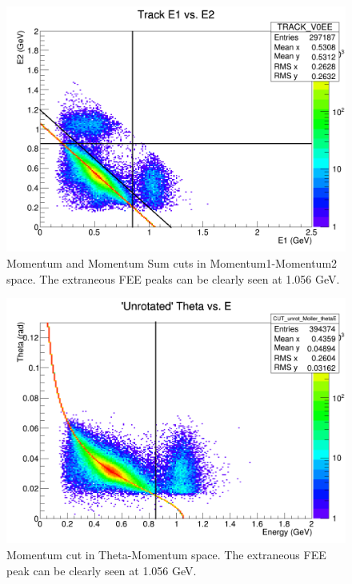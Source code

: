 \documentclass{article}
\begin{document}
\begin{figure}[H]
  	\includegraphics[width=\linewidth]{MollerPlots/DATA_TrackEE_cut}
  	\caption{Momentum and Momentum Sum cuts in Momentum1-Momentum2 space. The extraneous FEE peaks can be clearly seen at 1.056 GeV.}
  	\label{fig:MomCutsEE}
	\end{figure}

\begin{figure}[H]
  	\includegraphics[width=\linewidth]{MollerPlots/CUT_Unrotmoller_ThetaE_cut}
  	\caption{Momentum cut in Theta-Momentum space. The extraneous FEE peak can be clearly seen at 1.056 GeV.}
  	\label{fig:MomCutsET}
	\end{figure}
\end{document}
